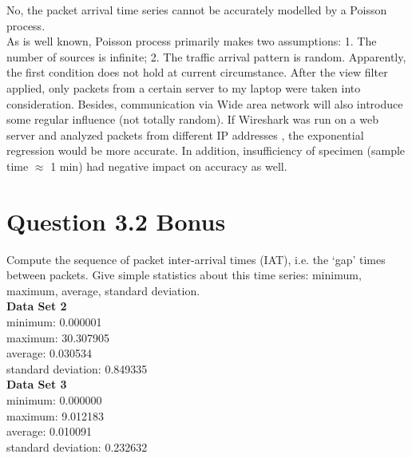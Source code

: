 \documentclass{article}
\newenvironment{homeworkProblem}[1]{
	\section*{#1}
	}{
}
\begin{document}
No, the packet arrival time series cannot be accurately modelled by a Poisson process.\\

As is well known, Poisson process primarily makes two assumptions: 1. The number of sources is infinite; 2. The traffic arrival pattern is random. Apparently, the first condition does not hold at current circumstance. After the view filter applied, only packets from a certain server to my laptop were taken into consideration. Besides, communication via Wide area network will also introduce some regular influence (not totally random). If Wireshark was run on a web server and analyzed packets from different IP addresses , the exponential regression would be more accurate. In addition, insufficiency of specimen (sample time $\approx$ 1 min) had negative impact on accuracy as well.

\clearpage
\begin{homeworkProblem}{Question 3.2 Bonus}
Compute the sequence of packet inter-arrival times (IAT), i.e. the `gap' times between packets. Give simple statistics about this time series: minimum, maximum, average, standard deviation.\\

\textbf{Data Set 2}\\
minimum: 0.000001\\
maximum: 30.307905\\
average: 0.030534\\
standard deviation: 0.849335\\

\textbf{Data Set 3}\\
minimum: 0.000000\\
maximum: 9.012183\\
average: 0.010091\\
standard deviation: 0.232632
\end{homeworkProblem}
\end{document}
